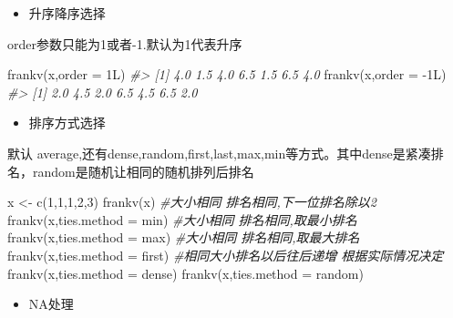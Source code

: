 \documentclass[
]{book}
\newenvironment{Shaded}{\begin{snugshade}}{\end{snugshade}}
\newcommand{\AttributeTok}[1]{\textcolor[rgb]{0.77,0.63,0.00}{#1}}
\newcommand{\CommentTok}[1]{\textcolor[rgb]{0.56,0.35,0.01}{\textit{#1}}}
\newcommand{\DecValTok}[1]{\textcolor[rgb]{0.00,0.00,0.81}{#1}}
\newcommand{\FunctionTok}[1]{\textcolor[rgb]{0.00,0.00,0.00}{#1}}
\newcommand{\NormalTok}[1]{#1}
\newcommand{\OtherTok}[1]{\textcolor[rgb]{0.56,0.35,0.01}{#1}}
\newcommand{\SpecialCharTok}[1]{\textcolor[rgb]{0.00,0.00,0.00}{#1}}
\newcommand{\StringTok}[1]{\textcolor[rgb]{0.31,0.60,0.02}{#1}}
\providecommand{\tightlist}{%
  \setlength{\itemsep}{0pt}\setlength{\parskip}{0pt}}
\begin{document}
\begin{itemize}
\tightlist
\item
  升序降序选择
\end{itemize}

order参数只能为1或者-1.默认为1代表升序

\begin{Shaded}
\begin{Highlighting}[]
\FunctionTok{frankv}\NormalTok{(x,}\AttributeTok{order =}\NormalTok{ 1L)}
\CommentTok{\#\textgreater{} [1] 4.0 1.5 4.0 6.5 1.5 6.5 4.0}
\FunctionTok{frankv}\NormalTok{(x,}\AttributeTok{order =} \SpecialCharTok{{-}}\NormalTok{1L)}
\CommentTok{\#\textgreater{} [1] 2.0 4.5 2.0 6.5 4.5 6.5 2.0}
\end{Highlighting}
\end{Shaded}

\begin{itemize}
\tightlist
\item
  排序方式选择
\end{itemize}

默认 average,还有dense,random,first,last,max,min等方式。其中dense是紧凑排名，random是随机让相同的随机排列后排名

\begin{Shaded}
\begin{Highlighting}[]
\NormalTok{x }\OtherTok{\textless{}{-}} \FunctionTok{c}\NormalTok{(}\DecValTok{1}\NormalTok{,}\DecValTok{1}\NormalTok{,}\DecValTok{1}\NormalTok{,}\DecValTok{2}\NormalTok{,}\DecValTok{3}\NormalTok{)}
\FunctionTok{frankv}\NormalTok{(x)  }\CommentTok{\#大小相同 排名相同,下一位排名除以2}
\FunctionTok{frankv}\NormalTok{(x,}\AttributeTok{ties.method =} \StringTok{\textquotesingle{}min\textquotesingle{}}\NormalTok{)  }\CommentTok{\#大小相同 排名相同,取最小排名}
\FunctionTok{frankv}\NormalTok{(x,}\AttributeTok{ties.method =} \StringTok{\textquotesingle{}max\textquotesingle{}}\NormalTok{)  }\CommentTok{\#大小相同 排名相同,取最大排名}
\FunctionTok{frankv}\NormalTok{(x,}\AttributeTok{ties.method =} \StringTok{\textquotesingle{}first\textquotesingle{}}\NormalTok{) }\CommentTok{\#相同大小排名以后往后递增 根据实际情况决定}
\FunctionTok{frankv}\NormalTok{(x,}\AttributeTok{ties.method =} \StringTok{\textquotesingle{}dense\textquotesingle{}}\NormalTok{)}
\FunctionTok{frankv}\NormalTok{(x,}\AttributeTok{ties.method =} \StringTok{\textquotesingle{}random\textquotesingle{}}\NormalTok{)}
\end{Highlighting}
\end{Shaded}

\begin{itemize}
\tightlist
\item
  NA处理
\end{itemize}
\end{document}
